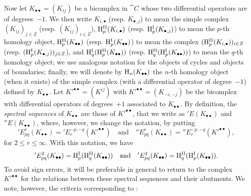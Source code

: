 \begin{env}[11.3.5]
\label{0.11.3.5}
Now let $K_{\bullet\bullet} = (K_{ij})$ be a bicomplex in $\cat{C}$ whose two differential operators are of degrees~$-1$.
We then write $K_{i,\bullet}$ (resp. $K_{\bullet,j}$) to mean the simple complex $(K_{ij})_{j\in Z}$ (resp. $(K_{ij})_{i\in Z}$), $\mathrm{H}_{p}^\mathrm{II}(K_{i, \bullet})$ (resp. $\mathrm{H}_{p}^\mathrm{I}(K_{\bullet, j})$) to mean the $p$-th homology object, $\mathrm{H}_{p}^\mathrm{II}(K_{\bullet\bullet})$ (resp. $\mathrm{H}_{p}^\mathrm{I}(K_{\bullet\bullet})$) to mean the complex $(\mathrm{H}_{p}^\mathrm{II}(K_{i, \bullet}))_{i \in Z}$ (resp. $(\mathrm{H}_{p}^\mathrm{I}(K_{\bullet, j}))_{j \in Z}$), and $\mathrm{H}_q^\mathrm{I}(\mathrm{H}_{p}^\mathrm{II}(K_{\bullet\bullet}))$ (resp. $\mathrm{H}_q^\mathrm{II}(\mathrm{H}_{p}^\mathrm{I}(K_{\bullet\bullet}))$) to mean the $q$-th homology object;
we use analogous notation for the objects of cycles and objects of boundaries;
finally, we will denote by $\mathrm{H}_n(K_{\bullet\bullet})$ the $n$-th homology object (when it exists) of the simple complex (with a differential operator of degree~$-1$) defined by $K_{\bullet\bullet}$.
Let $K'^{\bullet\bullet} = (K^{ij})$ with $K'^{\bullet\bullet} = (K_{-i,-j})$ be the bicomplex with differential operators of degrees~$+1$ associated to $K_{\bullet\bullet}$.
By definition, the \emph{spectral sequences} of $K_{\bullet\bullet}$ are those of $K'^{\bullet\bullet}$, that we write as $'E(K_{\bullet\bullet})$ and $''E(K_{\bullet\bullet})$, where, however, we change the notation, by putting
\[
  'E_{pq}^{r}(K_{\bullet\bullet})
  = 'E_{r}^{-p,-q}(K'^{\bullet\bullet})
  \quad\text{and}\quad
  ''E_{pq}^{r}(K_{\bullet\bullet})
  = ''E_{r}^{-p,-q}(K'^{\bullet\bullet}), 
\]
for $2\leq r \leq \infty$.
With this notation, we have
\[
  'E_{pq}^{2}(K_{\bullet\bullet})
  = \mathrm{H}_{p}^\mathrm{I}(\mathrm{H}_{q}^\mathrm{II}(K_{\bullet\bullet}))
  \quad\text{and}\quad
  'E_{pq}^{2}(K_{\bullet\bullet})
  = \mathrm{H}_{q}^\mathrm{II}(\mathrm{H}_{p}^\mathrm{I}(K_{\bullet\bullet})).
\]
To avoid sign errors, it will be preferable in general to return to the complex $K'^{\bullet\bullet}$ for the relations between these spectral sequences and their abutments.
We note, however, the criteria corresponding to :
\end{env}

